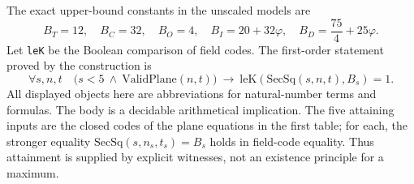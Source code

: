 The exact upper-bound constants in the unscaled models are
\begin{equation}
 B_T=12,\quad B_C=32,\quad B_O=4,\quad
 B_I=20+32\varphi,\quad B_D=\frac{75}{4}+25\varphi.
                                                               \label{eq:B}
\end{equation}
Let \texttt{leK} be the Boolean comparison of field codes. The
first-order statement proved by the construction is
\begin{equation}
 \forall s,n,t\quad
 \bigl(s<5\ \wedge\ \mathrm{ValidPlane}(n,t)\bigr)
 \ \longrightarrow\
 \mathrm{leK}(\mathrm{SecSq}(s,n,t),B_s)=1.          \label{eq:ipraendpoint}
\end{equation}
All displayed objects here are abbreviations for natural-number
terms and formulas. The body is a decidable arithmetical implication.
The five attaining inputs are the closed codes of the plane equations
in the first table; for each, the stronger equality
$\mathrm{SecSq}(s,n_s,t_s)=B_s$ holds in field-code equality.
Thus attainment is supplied by explicit witnesses, not an existence
principle for a maximum.

